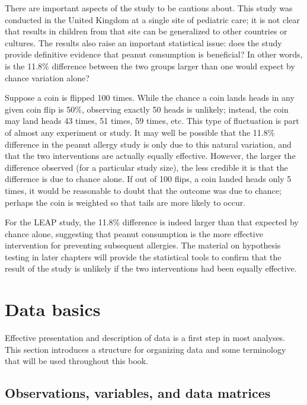 \begin{doublespace}
There are important aspects of the study to be cautious about.  This study was conducted in the United Kingdom at a single site of pediatric care; it is not clear that results in children from that site can be generalized to other countries or cultures. The results also raise an important statistical issue: does the study provide definitive evidence that peanut consumption is beneficial? In other words, is the 11.8\% difference between the two groups larger than one would expect by chance variation alone? 

Suppose a coin is flipped 100 times. While the chance a coin lands heads in any given coin flip is 50\%, observing exactly 50 heads is unlikely; instead, the coin may land heads 43 times, 51 times, 59 times, etc. This type of fluctuation is part of almost any experiment or study. It may well be possible that the 11.8\% difference in the peanut allergy study is only due to this natural variation, and that the two interventions are actually equally effective. However, the larger the difference observed (for a particular study size), the less credible it is that the difference is due to chance alone. If out of 100 flips, a coin landed heads only 5 times, it would be reasonable to doubt that the outcome was due to chance; perhaps the coin is weighted so that tails are more likely to occur.

For the LEAP study, the 11.8\% difference is indeed larger than that expected by chance alone, suggesting that peanut consumption is the more effective intervention for preventing subsequent allergies. The material on hypothesis testing in later chapters will provide the statistical tools to confirm that the result of the study is unlikely if the two interventions had been equally effective.



\section{Data basics}
\label{dataBasics}

Effective presentation and description of data is a first step in most analyses. This section introduces a structure for organizing data and some terminology that will be used throughout this book.


\subsection{Observations, variables, and data matrices}
\label{frogDataExample}


\end{doublespace}

